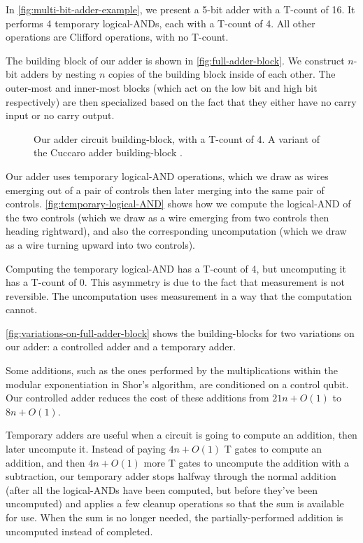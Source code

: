 \documentclass[twocolumn]{revtex4-1}
\begin{document}
In \autoref{fig:multi-bit-adder-example}, we present a 5-bit adder with a T-count of 16.
It performs 4 temporary logical-ANDs, each with a T-count of 4.
All other operations are Clifford operations, with no T-count.

The building block of our adder is shown in \autoref{fig:full-adder-block}.
We construct $n$-bit adders by nesting $n$ copies of the building block inside of each other.
The outer-most and inner-most blocks (which act on the low bit and high bit respectively) are then specialized based on the fact that they either have no carry input or no carry output.

\begin{figure}
  
  \caption{
	Our adder circuit building-block, with a T-count of 4.
	A variant of the Cuccaro adder building-block \citep{Cuccaro2004}.
  }
  \label{fig:full-adder-block}
\end{figure}

Our adder uses temporary logical-AND operations, which we draw as wires emerging out of a pair of controls then later merging into the same pair of controls.
\autoref{fig:temporary-logical-AND} shows how we compute the logical-AND of the two controls (which we draw as a wire emerging from two controls then heading rightward), and also the corresponding uncomputation (which we draw as a wire turning upward into two controls).

Computing the temporary logical-AND has a T-count of 4, but uncomputing it has a T-count of 0.
This asymmetry is due to the fact that measurement is not reversible.
The uncomputation uses measurement in a way that the computation cannot.


\autoref{fig:variations-on-full-adder-block} shows the building-blocks for two variations on our adder: a controlled adder and a temporary adder.

Some additions, such as the ones performed by the multiplications within the modular exponentiation in Shor's algorithm, are conditioned on a control qubit.
Our controlled adder reduces the cost of these additions from $21n + O(1)$ \citep{Coreas2017} to $8n + O(1)$.

Temporary adders are useful when a circuit is going to compute an addition, then later uncompute it.
Instead of paying $4n + O(1)$ T gates to compute an addition, and then $4n + O(1)$ more T gates to uncompute the addition with a subtraction, our temporary adder stops halfway through the normal addition (after all the logical-ANDs have been computed, but before they've been uncomputed) and applies a few cleanup operations so that the sum is available for use.
When the sum is no longer needed, the partially-performed addition is uncomputed instead of completed.
\end{document}
